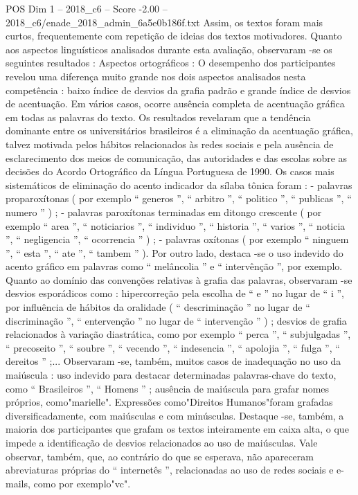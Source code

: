 \begin{textsample}{POS Dim 1 – 2018\_c6 – Score -2.00 – 2018\_c6/enade\_2018\_admin\_6a5e0b186f.txt}
Assim, os textos foram mais curtos, frequentemente com repetição de ideias dos textos motivadores.
Quanto aos aspectos linguísticos analisados durante esta avaliação, observaram -se os seguintes resultados : Aspectos ortográficos : O desempenho dos participantes revelou uma diferença muito grande nos dois aspectos analisados nesta competência : baixo índice de desvios da grafia padrão e grande índice de desvios de acentuação.
Em vários casos, ocorre ausência completa de acentuação gráfica em todas as palavras do texto.
Os resultados revelaram que a tendência dominante entre os universitários brasileiros é a eliminação da acentuação gráfica, talvez motivada pelos hábitos relacionados às redes sociais e pela ausência de esclarecimento dos meios de comunicação, das autoridades e das escolas sobre as decisões do Acordo Ortográfico da Língua Portuguesa de 1990.
Os casos mais sistemáticos de eliminação do acento indicador da sílaba tônica foram : - palavras proparoxítonas ( por exemplo “ generos ”, “ arbitro ”, “ politico ”, “ publicas ”, “ numero ” ) ; - palavras paroxítonas terminadas em ditongo crescente ( por exemplo “ area ”, “ noticiarios ”, “ individuo ”, “ historia ”, “ varios ”, “ noticia ”, “ negligencia ”, “ ocorrencia ” ) ; - palavras oxítonas ( por exemplo “ ninguem ”, “ esta ”, “ ate ”, “ tambem ” ).
Por outro lado, destaca -se o uso indevido do acento gráfico em palavras como “ melâncolia ” e “ intervênção ”, por exemplo.
Quanto ao domínio das convenções relativas à grafia das palavras, observaram -se desvios esporádicos como : hipercorreção pela escolha de “ e ” no lugar de “ i ”, por influência de hábitos da oralidade ( “ descriminação ” no lugar de “ discriminação ”, “ entervenção ” no lugar de “ intervenção ” ) ; desvios de grafia relacionados à variação diastrática, como por exemplo “ perca ”, “ subjulgadas ”, “ precoseito ”, “ soubre ”, “ vecendo ”, “ indesencia ”, “ apolojia ”, “ fulga ”, “ dereitos ” ;...
Observaram -se, também, muitos casos de inadequação no uso da maiúscula : uso indevido para destacar determinadas palavras-chave do texto, como “ Brasileiros ”, “ Homens ” ; ausência de maiúscula para grafar nomes próprios, como"marielle".
Expressões como"Direitos Humanos"foram grafadas diversificadamente, com maiúsculas e com minúsculas.
Destaque -se, também, a maioria dos participantes que grafam os textos inteiramente em caixa alta, o que impede a identificação de desvios relacionados ao uso de maiúsculas.
Vale observar, também, que, ao contrário do que se esperava, não apareceram abreviaturas próprias do “ internetês ”, relacionadas ao uso de redes sociais e e-mails, como por exemplo"vc".

\end{textsample}
